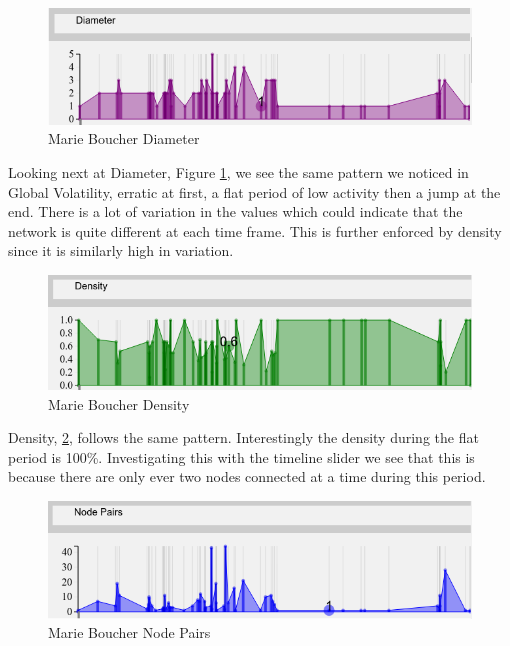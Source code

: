 \begin{figure}[h!]
  \begin{center}
  \includegraphics[trim={0 0 0 0}, width=140mm]{./Figures/marieBoucherDiameter.png}
  \caption{Marie Boucher Diameter}
  \label{fig:marieBoucherDiameter}
  \end{center}
\end{figure}

Looking next at Diameter, Figure \ref{fig:marieBoucherDiameter}, we see the same pattern we noticed in Global Volatility, erratic at first, a flat period of low activity then a jump at the end. There is a lot of variation in the values which could indicate that the network is quite different at each time frame. This is further enforced by density since it is similarly high in variation.

\begin{figure}[h!]
  \begin{center}
  \includegraphics[trim={0 0 0 0}, width=140mm]{./Figures/marieBoucherDensity.png}
  \caption{Marie Boucher Density}
  \label{fig:marieBoucherDensity}
  \end{center}
\end{figure}

Density, \ref{fig:marieBoucherDensity}, follows the same pattern. Interestingly the density during the flat period is 100\%. Investigating this with the timeline slider we see that this is because there are only ever two nodes connected at a time during this period. 

\begin{figure}[h!]
  \begin{center}
  \includegraphics[trim={0 0 0 0}, width=140mm]{./Figures/marieBoucherNodePairs.png}
  \caption{Marie Boucher Node Pairs}
  \label{fig:marieBoucherNodePairs}
  \end{center}
\end{figure}

